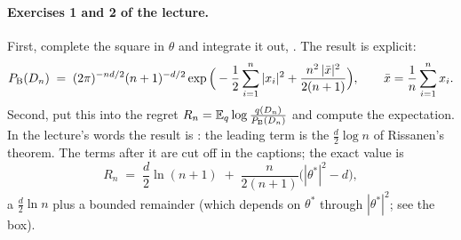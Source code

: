 \paragraph{Exercises 1 and 2 of the lecture.}
First, complete the square in $\theta$ and integrate it out, . The result is explicit:
\begin{equation}\label{eq:L5-gauss-evidence}
  P_{\mathrm{B}}(D_n)\;=\;(2\pi)^{-nd/2}(n+1)^{-d/2}\exp\Big(-\frac12\sum_{i=1}^n|x_i|^2+\frac{n^2\,|\bar x|^2}{2(n+1)}\Big),\qquad\bar x=\frac1n\sum_{i=1}^nx_i .
\end{equation}
Second, put this into the regret $R_n=\mathbb{E}_q\log\frac{q(D_n)}{P_{\mathrm{B}}(D_n)}$ and compute the expectation. In the lecture's words the result is : the leading term is the $\frac d2\log n$ of Rissanen's theorem. The terms after it are cut off in the captions; the exact value is
\begin{equation}\label{eq:L5-gauss-regret}
  R_n\;=\;\frac d2\ln(n+1)\;+\;\frac{n}{2(n+1)}\big(|\theta^*|^2-d\big),
\end{equation}
a $\frac d2\ln n$ plus a bounded remainder (which depends on $\theta^*$ through $|\theta^*|^2$; see the box).

